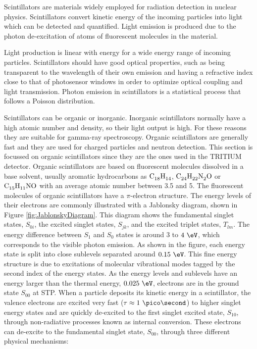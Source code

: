 Scintillators are materials widely employed for radiation detection in nuclear physics. Scintillators convert kinetic energy of the incoming particles into light which can be detected and quantified. Light emission is produced due to the photon de-excitation of atoms of fluorescent molecules in the material.

Light production is linear with energy for a wide energy range of incoming particles. Scintillators should have good optical properties, such as being transparent to the wavelength of their own emission and having a refractive index close to that of photosensor windows in order to optimize optical coupling and light transmission. Photon emission in scintillators is a statistical process that follows a Poisson distribution.

Scintillators can be organic or inorganic. Inorganic scintillators normally have a high atomic number and density, so their light output is high. For these reasons they are suitable for gamma-ray spectroscopy. Organic scintillators are generally fast and they are used for charged particles and neutron detection. This section is focussed on organic scintillators since they are the ones used in the TRITIUM detector. Organic scintillators are based on fluorescent molecules dissolved in a base solvent, usually aromatic hydrocarbons as $\ce{C_{18}H_{14}}$, $\ce{C_{24}H_{22}N_{2}O}$ or $\ce{C_{15}H_{11}NO}$ with an average atomic number between 3.5 and 5. The fluorescent molecules of organic scintillators have a $\pi$-electron structure. The energy levels of their electrons are commonly illustrated with a Jablonsky diagram, shown in Figure \ref{fig:JablonskyDiagram}. This diagram shows the fundamental singlet states, $S_{0i}$, the excited singlet states, $S_{jk}$, and the excited triplet states, $T_{lm}$. The energy difference between $S_1$ and $S_0$ states is around $3$ to $4~\eV$, which corresponds to the visible photon emission. As shown in the figure, each energy state is split into close sublevels separated around $0.15~\eV$. This fine energy structure is due to excitations of molecular vibrational modes tagged by the second index of the energy states. As the energy levels and sublevels have an energy larger than the thermal energy, $0.025~\eV$, electrons are in the ground state $S_{00}$ at STP. When a particle deposits its kinetic energy in a scintillator, the valence electrons are excited very fast ($\tau \approx 1~\pico\second$) to higher singlet energy states and are quickly de-excited to the first singlet excited state, $S_{10}$, through non-radiative processes known as internal conversion. These electrons can de-excite to the fundamental singlet state, $S_{00}$, through three different physical mechanisms:

